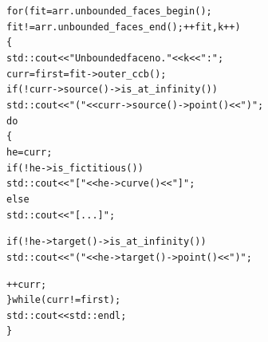\begin{ccAdvanced}
\begin{alltt}
  for (fit = arr.unbounded_faces_begin();
       fit != arr.unbounded_faces_end(); ++fit, k++)
  \{
    std::cout << "Unbounded face no. " << k << ": ";
    curr = first = fit->outer_ccb();
    if (! curr->source()->is_at_infinity())
      std::cout << "(" << curr->source()->point() << ")";
    do
    \{
      he = curr;
      if (! he->is_fictitious())
        std::cout << "   [" << he->curve() << "]   ";
      else
        std::cout << "   [ ... ]   ";

      if (! he->target()->is_at_infinity())
        std::cout << "(" << he->target()->point() << ")";

      ++curr;
    \} while (curr != first);
    std::cout << std::endl;
  \}
\end{alltt}

\end{ccAdvanced}

